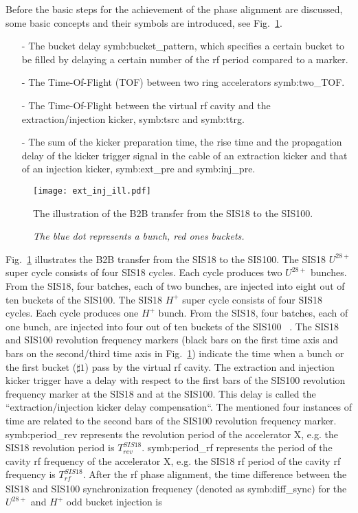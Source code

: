 
Before the basic steps for the achievement of the phase alignment are discussed, some basic concepts and their symbols are introduced, see Fig.~\ref{ext_inj_kicker}.

\begin{itemize}
\item[-] The bucket delay \gls{symb:bucket_pattern}, which specifies a certain bucket to be filled by delaying a certain number of the rf period compared to a marker.
\item[-] The Time-Of-Flight (\gls{TOF}) between two ring accelerators \gls{symb:two_TOF}. 
\item[-] The Time-Of-Flight between the virtual rf cavity and the extraction/injection kicker, \gls{symb:tsrc} and \gls{symb:ttrg}. 
\item[-] The sum of the kicker preparation time, the rise time and the propagation delay of the kicker trigger signal in the cable of an extraction kicker and that of an injection kicker, \gls{symb:ext_pre} and \gls{symb:inj_pre}.
\end{itemize}
\begin{landscape}
\begin{figure}[!htb]
   \centering   
   \texttt{[image: ext\_inj\_ill.pdf]}
   \caption{The illustration of the B2B transfer from the SIS18 to the SIS100.}
	\caption*{\textsl{\small{The blue dot represents a bunch, red ones buckets.}}}
   \label{ext_inj_kicker}
\end{figure}
\end{landscape}
Fig.~\ref{ext_inj_kicker} illustrates the B2B transfer from the SIS18 to the SIS100. The SIS18 $U^{28+}$ super cycle consists of four SIS18 cycles. Each cycle produces two $U^{28+}$ bunches. From the SIS18, four batches, each of two bunches, are injected into eight out of ten buckets of the SIS100. The SIS18 $H^{+}$ super cycle consists of four SIS18 cycles. Each cycle produces one $H^{+}$ bunch. From the SIS18, four batches, each of one bunch, are injected into four out of ten buckets of the SIS100 ~\cite{liebermann_fair_2013, liebermann_sis100_2013}. The SIS18 and SIS100 revolution frequency markers (black bars on the first time axis and bars on the second/third time axis in Fig.~\ref{ext_inj_kicker}) indicate the time when a bunch or the first bucket ($\sharp1$) pass by the virtual rf cavity. The extraction and injection kicker trigger have a delay with respect to the first bars of the SIS100 revolution frequency marker at the SIS18 and at the SIS100. This delay is called the ``extraction/injection kicker delay compensation``. The mentioned four instances of time are related to the second bars of the SIS100 revolution frequency marker. \gls{symb:period_rev} represents the revolution period of the accelerator X, e.g. the SIS18 revolution period is $T_{\mathit{rev}}^{\mathit{SIS18}}$. \gls{symb:period_rf} represents the period of the cavity rf frequency of the accelerator X, e.g. the SIS18 rf period of the cavity rf frequency is $T_{\mathit{rf}}^{\mathit{SIS18}}$. After the rf phase alignment, the time difference between the SIS18 and SIS100 synchronization frequency (denoted as \gls{symb:diff_sync}) for the $U^{28+}$ and $H^{+}$ odd bucket injection is
